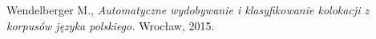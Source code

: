 \begin{thebibliography}{9}

Wendelberger M., 
\textit{Automatyczne wydobywanie i klasyfikowanie
kolokacji z korpusów języka polskiego.} 
Wrocław, 2015.


\end{thebibliography}